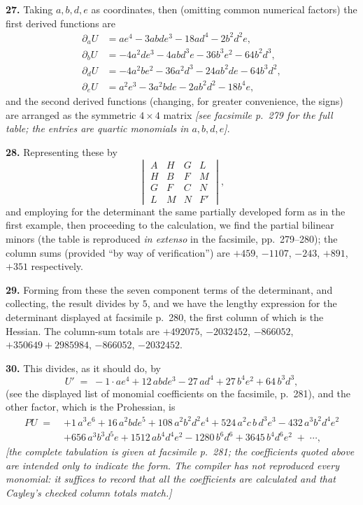 \documentclass[11pt,a4paper]{article}
\begin{document}
\medskip

\textbf{27.} Taking $a, b, d, e$ as coordinates, then (omitting common numerical factors) the first derived functions are
\[
\begin{aligned}
\partial_a U &= a e^4 - 3ab de^3 - 18 ad^4 - 2 b^2 d^2 e,\\
\partial_b U &= -4a^2 de^3 - 4abd^3 e - 36 b^3 e^2 - 64 b^2 d^3,\\
\partial_d U &= -4a^2 be^2 - 36 a^2 d^3 - 24 ab^2 de - 64 b^3 d^2,\\
\partial_e U &= a^2 e^3 - 3a^2 b de - 2ab^2 d^2 - 18 b^4 e,
\end{aligned}
\]
and the second derived functions (changing, for greater convenience, the signs) are arranged as the symmetric $4\times 4$ matrix \textit{[see facsimile p.~279 for the full table; the entries are quartic monomials in $a,b,d,e$]}.

\medskip

\textbf{28.} Representing these by
\[
\begin{vmatrix} A & H & G & L\\ H & B & F & M\\ G & F & C & N\\ L & M & N & F'\end{vmatrix},
\]
and employing for the determinant the same partially developed form as in the first example, then proceeding to the calculation, we find the partial bilinear minors (the table is reproduced \textit{in extenso} in the facsimile, pp.~279--280); the column sums (provided ``by way of verification'') are $+459$, $-1107$, $-243$, $+891$, $+351$ respectively.

\medskip

\textbf{29.} Forming from these the seven component terms of the determinant, and collecting, the result divides by $5$, and we have the lengthy expression for the determinant displayed at facsimile p.~280, the first column of which is the Hessian. The column-sum totals are $+492075$, $-2032452$, $-866052$, $+350649 + 2985984$, $-866052$, $-2032452$.

\medskip

\textbf{30.} This divides, as it should do, by
\[
U' \;=\; -1\cdot ae^4 + 12\, abde^3 - 27\, a d^4 + 27\, b^4 e^2 + 64\, b^3 d^3,
\]
(see the displayed list of monomial coefficients on the facsimile, p.~281), and the other factor, which is the Prohessian, is
\[
\begin{aligned}
PU \;=\; & +1\,a^3 e^6 + 16\, a^2 bde^5 + 108\, a^2 b^2 d^2 e^4 + 524\, a^2 c\, b\, d^3 e^3 - 432\, a^3 b^2 d^4 e^2 \\
& + 656\, a^3 b^3 d^5 e + 1512\, a b^4 d^4 e^2 - 1280\, b^6 d^6 + 3645\, b^4 d^6 e^2 \;+\; \dotsb,
\end{aligned}
\]
\textit{[the complete tabulation is given at facsimile p.~281; the coefficients quoted above are intended only to indicate the form. The compiler has not reproduced every monomial: it suffices to record that all the coefficients are calculated and that Cayley's checked column totals match.]}
\end{document}
